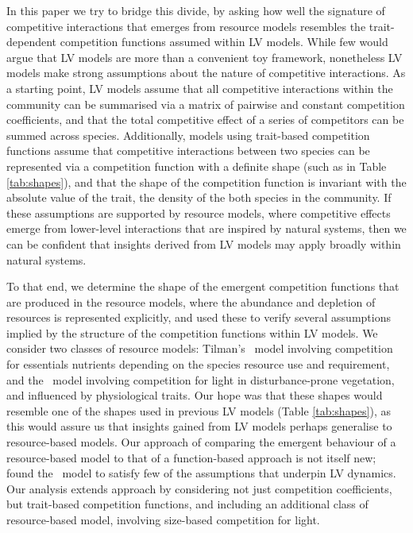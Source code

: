 \documentclass[a4paper,11pt]{article}
\begin{document}
In this paper we try to bridge this divide, by asking how well the signature of competitive interactions that emerges from resource models resembles the trait-dependent competition functions assumed within LV models. While few would argue that LV models are more than a convenient toy framework, nonetheless LV models make strong assumptions about the nature of competitive interactions. As a starting point, LV models assume that all competitive interactions within the community can be summarised via a matrix of pairwise and constant competition coefficients, and that the total competitive effect of a series of competitors can be summed across species. Additionally, models using trait-based competition functions assume that competitive interactions between two species can be represented via a competition function with a definite shape (such as in Table \ref{tab:shapes}), and that the shape of the competition function is invariant with the absolute value of the trait, the density of the both species in the community. If these assumptions are supported by resource models, where competitive effects emerge from lower-level interactions that are inspired by natural systems, then we can be confident that insights derived from LV models may apply broadly within natural systems. 

To that end, we determine the shape of the emergent competition functions that are produced in the resource models, where the abundance and depletion of resources is represented explicitly, and used these to verify several assumptions implied by the structure of the competition functions within LV models. We consider two classes of resource models: Tilman's \Rstar\ model involving competition for essentials nutrients depending on the species resource use and requirement, and the \plant\ model involving competition for light in disturbance-prone vegetation, and influenced by physiological traits. Our hope was that these shapes would resemble one of the shapes used in previous LV models (Table \ref{tab:shapes}), as this would assure us that insights gained from LV models perhaps generalise to resource-based models. Our approach of comparing the emergent behaviour of a resource-based model to that of a function-based approach is not itself new; \citet{Abrams-2008} found the \Rstar\ model to satisfy few of the assumptions that underpin LV dynamics. Our analysis extends \citeauthor{Abrams-2008} approach by considering not just competition coefficients, but trait-based competition functions, and including an additional class of resource-based model, involving size-based competition for light.
\end{document}
